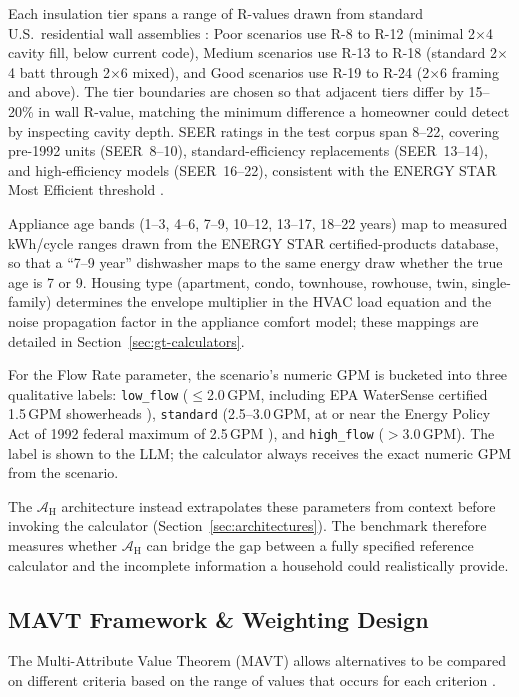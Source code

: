 \documentclass[a4paper,fleqn]{cas-dc}
\begin{document}
Each insulation tier spans a range of R-values drawn from standard U.S.\ residential wall assemblies \citep{cec_ja43_2013,energystar_insulation2023}: Poor scenarios use R-8 to R-12 (minimal 2$\times$4 cavity fill, below current code), Medium scenarios use R-13 to R-18 (standard 2$\times$4 batt through 2$\times$6 mixed), and Good scenarios use R-19 to R-24 (2$\times$6 framing and above). The tier boundaries are chosen so that adjacent tiers differ by 15--20\% in wall R-value, matching the minimum difference a homeowner could detect by inspecting cavity depth. SEER ratings in the test corpus span 8--22, covering pre-1992 units (SEER~8--10), standard-efficiency replacements (SEER~13--14), and high-efficiency models (SEER~16--22), consistent with the ENERGY STAR Most Efficient threshold \citep{energystar_ac2023}.

Appliance age bands (1--3, 4--6, 7--9, 10--12, 13--17, 18--22 years) map to measured kWh/cycle ranges drawn from the ENERGY STAR certified-products database, so that a ``7--9 year'' dishwasher maps to the same energy draw whether the true age is 7 or 9. Housing type (apartment, condo, townhouse, rowhouse, twin, single-family) determines the envelope multiplier in the HVAC load equation and the noise propagation factor in the appliance comfort model; these mappings are detailed in Section~\ref{sec:gt-calculators}.

For the Flow Rate parameter, the scenario's numeric GPM is bucketed into three qualitative labels: \texttt{low\_flow} ($\le$2.0\,GPM, including EPA WaterSense certified 1.5\,GPM showerheads \citep{epawatersense}), \texttt{standard} (2.5--3.0\,GPM, at or near the Energy Policy Act of 1992 federal maximum of 2.5\,GPM \citep{epawatersense}), and \texttt{high\_flow} ($>$3.0\,GPM). The label is shown to the LLM; the calculator always receives the exact numeric GPM from the scenario.

The $\mathcal{A}_{\text{H}}$ architecture instead extrapolates these parameters from context before invoking the calculator (Section~\ref{sec:architectures}). The benchmark therefore measures whether $\mathcal{A}_{\text{H}}$ can bridge the gap between a fully specified reference calculator and the incomplete information a household could realistically provide.

\subsection{MAVT Framework \& Weighting Design}
\label{sec:mavt-design}
The Multi-Attribute Value Theorem (MAVT) allows alternatives to be compared on different criteria based on the range of values that occurs for each criterion \citep{keeneyraiffa1976,dyer1979}.
\end{document}
